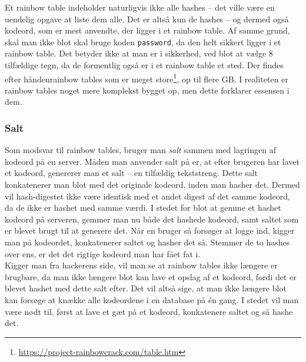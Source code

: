     Et rainbow table indeholder naturligvis ikke alle hashes -- det ville være en uendelig opgave at liste dem alle.
    Det er altså kun de hashes -- og dermed også kodeord, som er mest anvendte, der ligger i et rainbow table.
    Af samme grund, skal man ikke blot skal bruge koden \texttt{password}, da den helt sikkert ligger i et rainbow table.
    Det betyder ikke at man er i sikkerhed, ved blot at vælge 8 tilfældige tegn, da de formentlig også er i et rainbow table et sted.
    Der findes efter håndenrainbow tables som er meget store\footnote{\url{https://project-rainbowcrack.com/table.htm}}, op til flere GB.
    I realiteten er rainbow tables noget mere komplekst bygget op, men dette forklarer essensen i dem.


    \subsubsection{Salt}
    Som modsvar til rainbow tables, bruger man \emph{salt} sammen med lagringen af kodeord på en server. \cite{version2}
    Måden man anvender salt på er, at efter brugeren har lavet et kodeord, genererer man et salt -- en tilfældig tekststreng.
    Dette salt konkatenerer man blot med det originale kodeord, inden man hasher det.
    Dermed vil hash-digestet ikke være identisk med et andet digest af det samme kodeord, da de ikke er hashet med samme værdi.
    I stedet for blot at gemme et hashet kodeord på serveren, gemmer man nu både det hashede kodeord, samt saltet som er blevet brugt til at generere det.
    Når en bruger så forsøger at logge ind, kigger man på kodeordet, konkatenerer saltet og hasher det så.
    Stemmer de to hashes over ens, er det det rigtige kodeord man har fået fat i.\\
    Kigger man fra hackerens side, vil man se at rainbow tables ikke længere er brugbare, da man ikke længere blot kan lave et opslag af et kodeord, fordi det er blevet hashet med dette salt efter.
    Det vil altså sige, at man ikke længere blot kan forsøge at knække alle kodeordene i en database på én gang.
    I stedet vil man være nødt til, først at lave et gæt på et kodeord, konkatenere saltet og så hashe det.

